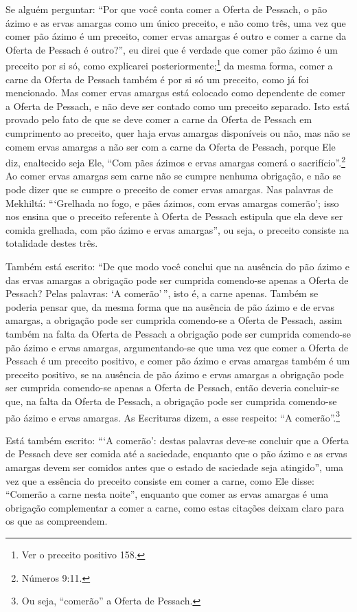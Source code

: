 Se alguém perguntar: ``Por que você conta comer a Oferta de Pessach, o
pão ázimo e as ervas amargas como um único preceito, e não como três,
uma vez que comer pão ázimo é um preceito, comer ervas amargas é outro
e comer a carne da Oferta de Pessach é outro?'', eu direi que é verdade
que comer pão ázimo é um preceito por si só, como explicarei
posteriormente;\footnote{Ver o preceito positivo 158.} da mesma forma, comer a carne da
Oferta de Pessach também é por si só um preceito, como já foi
mencionado. Mas comer ervas amargas está colocado como dependente de
comer a Oferta de Pessach, e não deve ser contado como um preceito
separado. Isto está provado pelo fato de que se deve comer a carne da
Oferta de Pessach em cumprimento ao preceito, quer haja ervas amargas
disponíveis ou não, mas não se comem ervas amargas
a não ser com a carne da Oferta de Pessach, porque Ele diz,
enaltecido seja Ele, ``Com pães ázimos e ervas amargas comerá o
sacrifício''.\footnote{Números 9:11.} Ao comer ervas amargas sem carne não se
cumpre nenhuma obrigação, e não se pode dizer que se cumpre o preceito
de comer ervas amargas. Nas palavras de Mekhiltá: ```Grelhada no fogo, e
pães ázimos, com ervas amargas comerão'; isso nos ensina que o preceito
referente à Oferta de Pessach estipula que ela deve ser comida
grelhada, com pão ázimo e ervas amargas'', ou seja, o preceito consiste
na totalidade destes três.

Também está escrito: ``De que modo você conclui que na ausência do pão
ázimo e das ervas amargas a obrigação pode ser cumprida comendo-se
apenas a Oferta de Pessach? Pelas palavras: `A comerão'\,'', isto é, a
carne apenas. Também se poderia pensar que, da mesma forma que na
ausência de pão ázimo e de ervas amargas, a obrigação pode ser cumprida
comendo-se a Oferta de Pessach, assim também na falta da Oferta de
Pessach a obrigação pode ser cumprida comendo-se pão ázimo e ervas
amargas, argumentando-se que uma vez que comer a Oferta de Pessach é
um preceito positivo, e comer pão ázimo e ervas amargas também é um
preceito positivo, se na ausência de pão ázimo e ervas amargas a
obrigação pode ser cumprida comendo-se apenas a Oferta de Pessach,
então deveria concluir-se que, na falta da Oferta de Pessach, a
obrigação pode ser cumprida comendo-se pão ázimo e ervas amargas. As
Escrituras dizem, a esse respeito: ``A comerão''.\footnote{Ou seja, ``comerão'' a Oferta de Pessach.}

Está também escrito: ```A comerão': destas palavras deve-se concluir que
a Oferta de Pessach deve ser comida até a saciedade, enquanto que o pão
ázimo e as ervas amargas devem ser comidos antes que o estado de
saciedade seja atingido'', uma vez que a essência do preceito consiste
em comer a carne, como Ele disse: ``Comerão a carne nesta noite'',
enquanto que comer as ervas amargas é uma obrigação complementar a comer
a carne, como estas citações deixam claro para os que as compreendem.

